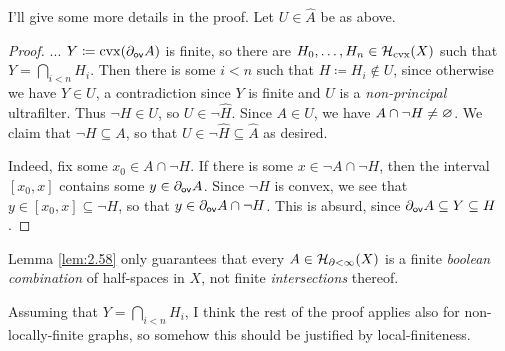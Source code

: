 \documentclass{amsart}
\begin{document}
    I'll give some more details in the proof. Let $U\in\widehat{A}$ be as above.

    \begin{proof}
        $...$ $Y\coloneqq\cvx(\del_\sf{ov}A)$ is finite, so there are $H_0,\dots,H_n\in\mc{H}_\textrm{cvx}(X)$ such that $Y=\bigcap_{i<n}H_i$. Then there is some $i<n$ such that $H\coloneqq H_i\not\in U$, since otherwise we have $Y\in U$, a contradiction since $Y$ is finite and $U$ is a \textit{non-principal} ultrafilter. Thus $\lnot H\in U$, so $U\in\lnot\widehat{H}$. Since $A\in U$, we have $A\cap\lnot H\neq\em$. We claim that $\lnot H\subseteq A$, so that $U\in\lnot\widehat{H}\subseteq\widehat{A}$ as desired.

        Indeed, fix some $x_0\in A\cap\lnot H$. If there is some $x\in\lnot A\cap\lnot H$, then the interval $[x_0,x]$ contains some $y\in\del_\sf{ov}A$. Since $\lnot H$ is convex, we see that $y\in[x_0,x]\subseteq\lnot H$, so that $y\in\del_\sf{ov}A\cap\lnot H$. This is absurd, since $\del_\sf{ov}A\subseteq Y\subseteq H$.
    \end{proof}

    \begin{question}
        Lemma \ref{lem:2.58} only guarantees that every $A\in\mc{H}_{\del<\infty}(X)$ is a finite \textit{boolean combination} of half-spaces in $X$, not finite \textit{intersections} thereof.

        Assuming that $Y=\bigcap_{i<n}H_i$, I think the rest of the proof applies also for non-locally-finite graphs, so somehow this should be justified by local-finiteness.
    \end{question}

    \begin{question}

    \end{question}
\end{document}
